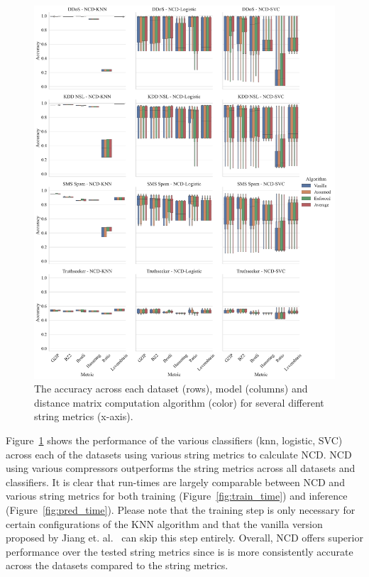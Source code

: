 \documentclass[conference]{IEEEtran}
\begin{document}
\begin{figure}[htb]
    \centering
    \includegraphics[width=\textwidth]{images/accuracy_vs_algorithm.pdf}
    \caption{The accuracy across each dataset (rows), model (columns) and distance matrix computation algorithm (color) for several different string metrics (x-axis).}
    \label{fig:metric_acc}
\end{figure}

Figure~\ref{fig:metric_acc} shows the performance of the various classifiers (knn, logistic, SVC) across each of the datasets using various string metrics to calculate NCD. 
NCD using various compressors outperforms the string metrics across all datasets and classifiers. 
It is clear that run-times are largely comparable between NCD and various string metrics for both training (Figure~\ref{fig:train_time}) and inference (Figure~\ref{fig:pred_time}). 
Please note that the training step is only necessary for certain configurations of the KNN algorithm and that the vanilla version proposed by Jiang et. al.~\cite{jiang2022less} can skip this step entirely. 
Overall, NCD offers superior performance over the tested string metrics since is is more consistently accurate across the datasets compared to the string metrics. 
\end{document}
